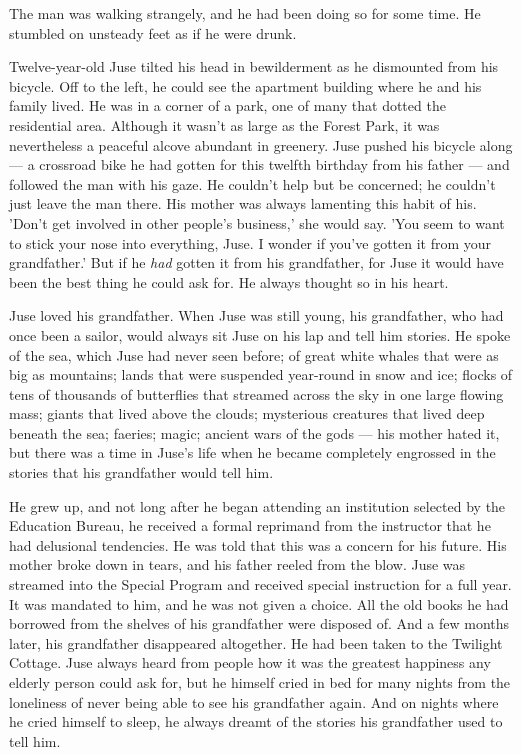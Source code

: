 \mybreak

The man was walking strangely, and he had been doing so for some time.
He stumbled on unsteady feet as if he were drunk.

Twelve-year-old Juse tilted his head in bewilderment as he dismounted
from his bicycle. Off to the left, he could see the apartment building
where he and his family lived. He was in a corner of a park, one of many
that dotted the residential area. Although it wasn't as large as the
Forest Park, it was nevertheless a peaceful alcove abundant in greenery.
Juse pushed his bicycle along --- a crossroad bike he had gotten for this
twelfth birthday from his father --- and followed the man with his gaze.
He couldn't help but be concerned; he couldn't just leave the man there.
His mother was always lamenting this habit of his. 'Don't get involved
in other people's business,' she would say. 'You seem to want to stick
your nose into everything, Juse. I wonder if you've gotten it from your
grandfather.' But if he \emph{had} gotten it from his grandfather, for Juse it
would have been the best thing he could ask for. He always thought so in
his heart.

Juse loved his grandfather. When Juse was still young, his grandfather,
who had once been a sailor, would always sit Juse on his lap and tell
him stories. He spoke of the sea, which Juse had never seen before; of
great white whales that were as big as mountains; lands that were
suspended year-round in snow and ice; flocks of tens of thousands of
butterflies that streamed across the sky in one large flowing mass;
giants that lived above the clouds; mysterious creatures that lived deep
beneath the sea; faeries; magic; ancient wars of the gods --- his mother
hated it, but there was a time in Juse's life when he became completely
engrossed in the stories that his grandfather would tell him.

He grew up, and not long after he began attending an institution
selected by the Education Bureau, he received a formal reprimand from
the instructor that he had delusional tendencies. He was told that this
was a concern for his future. His mother broke down in tears, and his
father reeled from the blow. Juse was streamed into the Special Program
and received special instruction for a full year. It was mandated to
him, and he was not given a choice. All the old books he had borrowed
from the shelves of his grandfather were disposed of. And a few months
later, his grandfather disappeared altogether. He had been taken to the
Twilight Cottage. Juse always heard from people how it was the greatest
happiness any elderly person could ask for, but he himself cried in bed
for many nights from the loneliness of never being able to see his
grandfather again. And on nights where he cried himself to sleep, he
always dreamt of the stories his grandfather used to tell him.

